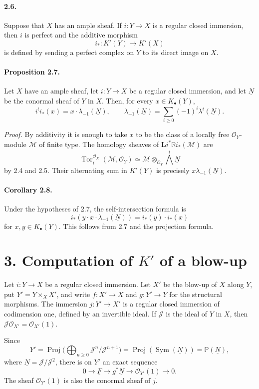 \documentclass[11pt]{article}
\theoremstyle{plain}
\theoremstyle{definition}
\theoremstyle{remark}
\newcommand{\bbP}{\mathbb P}
\newcommand{\RR}{\mathbb R}
\newcommand{\cJ}{\mathcal J}\newcommand{\cK}{\mathcal K}\newcommand{\cL}{\mathcal L}
\newcommand{\cM}{\mathcal M}\newcommand{\cN}{\mathcal N}\newcommand{\cO}{\mathcal O}
\DeclareMathOperator{\Proj}{Proj}
\DeclareMathOperator{\Tor}{Tor}
\providecommand{\uF}{\underline{F}}
\providecommand{\uN}{\underline{N}}
\providecommand{\Sym}{\operatorname{Sym}}
\providecommand{\Kdot}{K_\bullet}
\providecommand{\LL}{\mathbf L}
\begin{document}
\paragraph{2.6.} Suppose that $X$ has an ample sheaf. If $i:Y\to X$ is a regular closed immersion, then $i$ is perfect and the additive morphism
\[
i_*:K'(Y)\to K'(X)
\]
is defined by sending a perfect complex on $Y$ to its direct image on $X$.

\paragraph{Proposition 2.7.} Let $X$ have an ample sheaf, let $i:Y\to X$ be a regular closed immersion, and let $\uN$ be the conormal sheaf of $Y$ in $X$. Then, for every $x\in\Kdot(Y)$,
\[
i^!i_*(x)=x\cdot\lambda_{-1}(\uN),
\qquad
\lambda_{-1}(\uN)=\sum_{i\geq0}(-1)^i\lambda^i(\uN).
\]

\emph{Proof.} By additivity it is enough to take $x$ to be the class of a locally free $\cO_Y$-module $\cM$ of finite type. The homology sheaves of $\LL i^*\RR i_*(\cM)$ are
\[
\Tor_i^{\cO_X}(\cM,\cO_Y)\simeq \cM\otimes_{\cO_Y}\bigwedge^i\uN
\]
by 2.4 and 2.5. Their alternating sum in $K'(Y)$ is precisely $x\lambda_{-1}(\uN)$.

\paragraph{Corollary 2.8.} Under the hypotheses of 2.7, the self-intersection formula is
\[
i_*(y\cdot x\cdot\lambda_{-1}(\uN))=i_*(y)\cdot i_*(x)
\]
for $x,y\in\Kdot(Y)$. This follows from 2.7 and the projection formula.

\section*{3. Computation of $K'$ of a blow-up}

Let $i:Y\to X$ be a regular closed immersion. Let $X'$ be the blow-up of $X$ along $Y$, put $Y'=Y\times_XX'$, and write $f:X'\to X$ and $g:Y'\to Y$ for the structural morphisms. The immersion $j:Y'\to X'$ is a regular closed immersion of codimension one, defined by an invertible ideal. If $\cJ$ is the ideal of $Y$ in $X$, then $\cJ\cO_{X'}=\cO_{X'}(1)$.

Since
\[
Y'=\Proj\bigl(\bigoplus_{n\geq0}\cJ^n/\cJ^{n+1}\bigr)
=\Proj(\Sym(\uN))=\bbP(\uN),
\]
where $\uN=\cJ/\cJ^2$, there is on $Y'$ an exact sequence
\[
0\to\uF\to g^*\uN\to\cO_{Y'}(1)\to0.
\]
The sheaf $\cO_{Y'}(1)$ is also the conormal sheaf of $j$.
\end{document}
